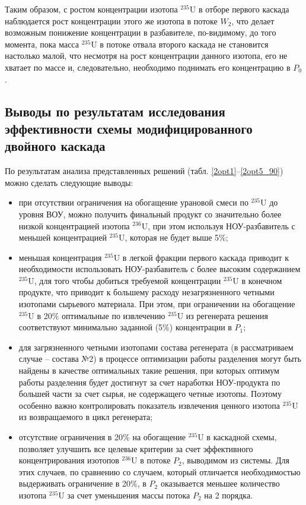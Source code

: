 Таким образом, с ростом концентрации изотопа $^{235}$U в отборе первого каскада наблюдается рост концентрации этого же изотопа в потоке $W_2$, что делает возможным понижение концентрации в разбавителе, по-видимому, до того момента, пока масса $^{235}$U в потоке отвала второго каскада не становится настолько малой, что несмотря на рост концентрации данного изотопа, его не хватает по массе и, следовательно, необходимо поднимать его концентрацию в $P_0$.



\subsection{Выводы по результатам исследования эффективности схемы модифицированного двойного каскада}


По результатам анализа представленных решений (табл. \ref{2opt1}--\ref{2opt5_90}) можно сделать следующие выводы:
\begin{itemize}
    \item при отсутствии ограничения на обогащение урановой смеси по $^{235}$U до уровня ВОУ, можно получить финальный продукт со значительно более низкой концентрацией изотопа $^{236}$U, при этом используя НОУ-разбавитель с меньшей концентрацией $^{235}$U, которая не будет выше 5\%;
    \item меньшая концентрация $^{235}$U в легкой фракции первого каскада приводит к необходимости использовать НОУ-разбавитель с более высоким содержанием $^{235}$U, для того чтобы добиться требуемой концентрации $^{235}$U в конечном продукте, что приводит к большему расходу незагрязненного четными изотопами сырьевого материала. При этом, при ограничении на обогащение $^{235}$U в 20\% оптимальные по извлечению $^{235}$U из регенерата решения соответствуют минимально заданной (5\%) концентрации в $P_1$;
    \item для загрязненного четными изотопами состава регенерата (в рассматриваем случае -- состава №2) в процессе оптимизации работы разделения могут быть найдены в качестве оптимальных такие решения, при которых оптимум работы разделения будет достигнут за счет наработки НОУ-продукта по большей части за счет сырья, не содержащего четные изотопы. Поэтому особенно важно контролировать показатель извлечения ценного изотопа $^{235}$U из возвращаемого в цикл регенерата;
    \item отсутствие ограничения в 20\% на обогащение $^{235}$U в каскадной схемы, позволяет улучшить все целевые критерии за счет эффективного концентрирования изотопов $^{236}$U в потоке $P_2$, выводимом из системы. Для этих случаев, по сравнению со случаем, который отличается необходимостью выдерживать ограничение в 20\%, в $P_2$ оказывается меньшее количество изотопа $^{235}$U за счет уменьшения массы потока $P_2$ на 2 порядка. 
\end{itemize}


